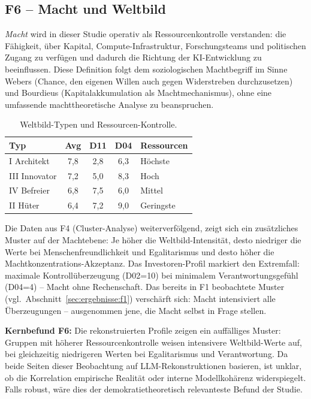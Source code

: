 \documentclass[12pt,a4paper]{article}
\begin{document}
\subsection{F6 -- Macht und Weltbild}
\label{sec:ergebnisse:f6}

\emph{Macht} wird in dieser Studie operativ als Ressourcenkontrolle verstanden: die F\"ahigkeit, \"uber Kapital, Compute-Infrastruktur, Forschungsteams und politischen Zugang zu verf\"ugen und dadurch die Richtung der KI-Entwicklung zu beeinflussen. Diese Definition folgt dem soziologischen Machtbegriff im Sinne Webers (\glqq Chance, den eigenen Willen auch gegen Widerstreben durchzusetzen\grqq) und Bourdieus (Kapitalakkumulation als Machtmechanismus), ohne eine umfassende machttheoretische Analyse zu beanspruchen.

\begin{table}[htbp]
  \centering
  \caption{Weltbild-Typen und Ressourcen-Kontrolle.}
  \label{tab:macht}
  \begin{tabular}{l c c c l}
    \toprule
    \textbf{Typ} & \textbf{Avg} & \textbf{D11} & \textbf{D04} & \textbf{Ressourcen} \\
    \midrule
    I Architekt  & 7,8 & 2,8 & 6,3 & H\"ochste \\
    III Innovator & 7,2 & 5,0 & 8,3 & Hoch \\
    IV Befreier  & 6,8 & 7,5 & 6,0 & Mittel \\
    II H\"uter   & 6,4 & 7,2 & 9,0 & Geringste \\
    \bottomrule
  \end{tabular}
\end{table}

Die Daten aus F4 (Cluster-Analyse) weiterverf\"olgend, zeigt sich ein zus\"atzliches Muster auf der Machtebene: Je h\"oher die Weltbild-Intensit\"at, desto niedriger die Werte bei Menschenfreundlichkeit und Egalitarismus und desto h\"oher die Machtkonzentrations-Akzeptanz. Das Investoren-Profil markiert den Extremfall: maximale Kontroll\"uberzeugung (D02=10) bei minimalem Verantwortungsgef\"uhl (D04=4) -- \glqq Macht ohne Rechenschaft\grqq. Das bereits in F1 beobachtete Muster (vgl.\ Abschnitt~\ref{sec:ergebnisse:f1}) versch\"arft sich: Macht intensiviert alle \"Uberzeugungen -- ausgenommen jene, die Macht selbst in Frage stellen.

\medskip
\noindent\textbf{Kernbefund F6:} Die rekonstruierten Profile zeigen ein auff\"alliges Muster: Gruppen mit h\"oherer Ressourcenkontrolle weisen intensivere Weltbild-Werte auf, bei gleichzeitig niedrigeren Werten bei Egalitarismus und Verantwortung. Da beide Seiten dieser Beobachtung auf LLM-Rekonstruktionen basieren, ist unklar, ob die Korrelation empirische Realit\"at oder interne Modellkoh\"arenz widerspiegelt. Falls robust, w\"are dies der demokratietheoretisch relevanteste Befund der Studie.
\end{document}
